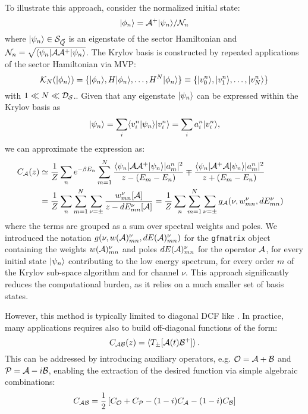\documentclass[edipack_sp.tex]{subfiles}
\begin{document}
To illustrate this approach, consider the normalized initial state: 
$$
\ket{\phi_n}=\AA^+\ket{\psi_n}/\NN_n
$$
where  $\ket{\psi_n}\in\SS_{\vec{Q}}$ is an eigenstate of the sector Hamiltonian and $\NN_n=\sqrt{\bra{\psi_n}\AA
  \AA^+\ket{\psi_n}}$.
The Krylov basis is constructed by repeated applications of the sector Hamiltonian via MVP: 
$$
\mathcal{K}_{N} (\ket{\phi_n})=\{\ket{\phi_n}, H\ket{\phi_n}, \dots,
H^N\ket{\phi_n}\}\equiv \{\ket{v^n_0}, \ket{v^n_1},\dots, \ket{v^n_N}
\}
$$ 
with $1 \ll N \ll \DD_\SS$..
Given that any eigenstate $\ket{\psi_n}$ can be expressed within the Krylov basis as
$$
\ket{\psi_n} = \sum_i  \ibra v^n_i|\psi_n \iket  \ket{ v^n_i} =
\sum_i a^n_i \ket{v^n_i}, 
$$
we can approximate the expression  as:  
\begin{equation}
  \label{eqGKrylov}
  \begin{split}
    C_\AA(z)  &\simeq \frac{1}{Z}\sum_n e^{-\beta E_n}
    \sum_{m=1}^{N} \frac{\bra{\psi_n}\AA \AA^+\ket{\psi_n} |a^n_m|^2}{
      z - (E_m-E_n)} \mp \frac{\bra{\psi_n}\AA^+ \AA\ket{\psi_n}
      |a^n_m|^2}{ z + (E_m-E_n)}\cr
    &= \frac{1}{Z}\sum_n\sum_{m=1}^{N} \sum_{\nu=\pm}\frac{w^{\nu}_{mn}[\AA]}{z - dE^\nu_{mn}[\AA]} 
    = \frac{1}{Z}\sum_n
    \sum_{m=1}^{N} \sum_{\nu=\pm} g_\AA(\nu, w^{\nu}_{mn},  dE^\nu_{mn}) \cr
  \end{split}
\end{equation}
where the terms are grouped as a sum over spectral weights and
poles. We introduced the notation $g(\nu, w(\AA)^{\nu}_{mn},  dE(\AA)^\nu_{mn})$
for the {\tt gfmatrix} object containing the weights $w(\AA)^{\nu}_{mn}$ and
poles $dE(\AA)^{\nu}_{mn}$ for the operator $\AA$, for every initial state $\ket{\psi_n}$
contributing to the low energy spectrum, for every order $m$ of the
Krylov sub-space algorithm and for channel $\nu$.
This approach significantly reduces the computational burden, as it
relies on a much smaller set of basis states.

However, this method is typically limited to diagonal DCF like
. In practice, many applications requires also to build off-diagonal
functions of the form:
$$
C_{\AA\BB}(z) = \ibra T_{\pm}[\AA(t) \BB^+]\iket\, .
$$
This can be addressed by introducing auxiliary operators, e.g.  $\OO=\AA +\BB$ and
$\PP=\AA-i\BB$, enabling the extraction of the desired function via
simple algebraic combinations:
$$
C_{\AA\BB} = \frac{1}{2}\left[C_\OO + C_\PP - (1-i)C_\AA -(1-i)C_\BB\right]
$$
\end{document}
